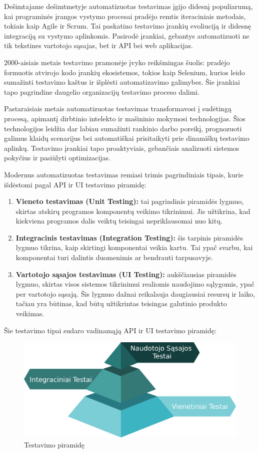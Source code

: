 \documentclass[
]{VUMIFPSkursinis}
\begin{document}
Dešimtajame dešimtmetyje automatizuotas testavimas įgijo didesnį populiarumą, kai programinės įrangos vystymo procesai pradėjo remtis iteraciniais metodais, tokiais kaip Agile ir Scrum. Tai paskatino testavimo įrankių evoliuciją ir didesnę integraciją su vystymo aplinkomis. Pasirodė įrankiai, gebantys automatizuoti ne tik tekstines vartotojo sąsajas, bet ir API bei web aplikacijas.

2000-aisiais metais testavimo pramonėje įvyko reikšmingas šuolis: pradėjo formuotis atvirojo kodo įrankių ekosistemos, tokios kaip Selenium, kurios leido sumažinti testavimo kaštus ir išplėsti automatizavimo galimybes. Šie įrankiai tapo pagrindine daugelio organizacijų testavimo proceso dalimi.

Pastaraisiais metais automatizuotas testavimas transformavosi į sudėtingą procesą, apimantį dirbtinio intelekto ir mašininio mokymosi technologijas. Šios technologijos leidžia dar labiau sumažinti rankinio darbo poreikį, prognozuoti galimus klaidų scenarijus bei automatiškai prisitaikyti prie dinamiškų testavimo aplinkų. Testavimo įrankiai tapo proaktyviais, gebančiais analizuoti sistemos pokyčius ir pasiūlyti optimizacijas.

Modernus automatizuotas testavimas remiasi trimis pagrindiniais tipais, kurie išdėstomi pagal API ir UI testavimo piramidę:
\begin{enumerate}
    \item \textbf{Vieneto testavimas (Unit Testing):} tai pagrindinis piramidės lygmuo, skirtas atskirų programos komponentų veikimo tikrinimui. Jis užtikrina, kad kiekviena programos dalis veiktų teisingai nepriklausomai nuo kitų.
    \item \textbf{Integracinis testavimas (Integration Testing):} šis tarpinis piramidės lygmuo tikrina, kaip skirtingi komponentai veikia kartu. Tai ypač svarbu, kai komponentai turi dalintis duomenimis ar bendrauti tarpusavyje.
    \item \textbf{Vartotojo sąsajos testavimas (UI Testing):} aukščiausias piramidės lygmuo, skirtas visos sistemos tikrinimui realiomis naudojimo sąlygomis, ypač per vartotojo sąsają. Šis lygmuo dažnai reikalauja daugiausiai resursų ir laiko, tačiau yra būtinas, kad būtų užtikrintas teisingas galutinio produkto veikimas.
\end{enumerate}

Šie testavimo tipai sudaro vadinamąją API ir UI testavimo piramidę:

\begin{figure}[H]
    \centering
    \includegraphics[scale=0.25]{img/Piramide.png}
    \caption{Testavimo piramidę}
    \label{img:piramide}
\end{figure}
\end{document}
